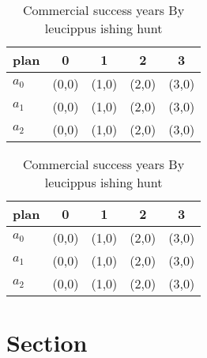 \documentclass[a4paper]{article}
\begin{document}
\begin{table}
\begin{adjustbox}{width=0.6\columnwidth}
\begin{tabular}{|l|l|l|l|l|}
\hline
\textbf{plan} & \multicolumn{1}{c|}{\textbf{0}} & \multicolumn{1}{c|}{\textbf{1}} & \multicolumn{1}{c|}{\textbf{2}} & \multicolumn{1}{c|}{\textbf{3}} \\ \hline
\textbf{$a_0$}  & (0,0) & (1,0) & (2,0) & (3,0) \\ \hline
\textbf{$a_1$}  & (0,0) & (1,0) & (2,0) & (3,0) \\ \hline
\textbf{$a_2$}  & (0,0) & (1,0) & (2,0) & (3,0) \\ \hline
\end{tabular}
\end{adjustbox}
\caption{Commercial success years By leucippus ishing hunt
}
\end{table}

\begin{table}
\begin{adjustbox}{width=0.6\columnwidth}
\begin{tabular}{|l|l|l|l|l|}
\hline
\textbf{plan} & \multicolumn{1}{c|}{\textbf{0}} & \multicolumn{1}{c|}{\textbf{1}} & \multicolumn{1}{c|}{\textbf{2}} & \multicolumn{1}{c|}{\textbf{3}} \\ \hline
\textbf{$a_0$}  & (0,0) & (1,0) & (2,0) & (3,0) \\ \hline
\textbf{$a_1$}  & (0,0) & (1,0) & (2,0) & (3,0) \\ \hline
\textbf{$a_2$}  & (0,0) & (1,0) & (2,0) & (3,0) \\ \hline
\end{tabular}
\end{adjustbox}
\caption{Commercial success years By leucippus ishing hunt
}
\end{table}

\section{Section}
\end{document}
